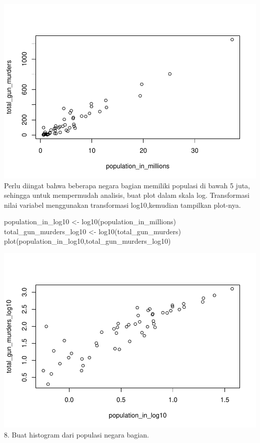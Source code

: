 \documentclass[
]{article}
\newenvironment{Shaded}{\begin{snugshade}}{\end{snugshade}}
\newcommand{\FunctionTok}[1]{\textcolor[rgb]{0.00,0.00,0.00}{#1}}
\newcommand{\NormalTok}[1]{#1}
\newcommand{\OtherTok}[1]{\textcolor[rgb]{0.56,0.35,0.01}{#1}}
\begin{document}
\includegraphics{Latihan3_123190027_files/figure-latex/unnamed-chunk-8-1.pdf}
Perlu diingat bahwa beberapa negara bagian memiliki populasi di bawah 5
juta, sehingga untuk mempermudah analisis, buat plot dalam skala log.
Transformasi nilai variabel menggunakan transformasi log10,kemudian
tampilkan plot-nya.

\begin{Shaded}
\begin{Highlighting}[]
\NormalTok{population\_in\_log10 }\OtherTok{\textless{}{-}} \FunctionTok{log10}\NormalTok{(population\_in\_millions)}
\NormalTok{total\_gun\_murders\_log10 }\OtherTok{\textless{}{-}} \FunctionTok{log10}\NormalTok{(total\_gun\_murders)}
\FunctionTok{plot}\NormalTok{(population\_in\_log10,total\_gun\_murders\_log10)}
\end{Highlighting}
\end{Shaded}

\includegraphics{Latihan3_123190027_files/figure-latex/unnamed-chunk-9-1.pdf}
8. Buat histogram dari populasi negara bagian.
\end{document}
